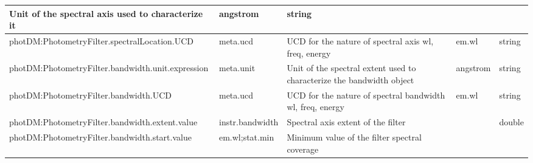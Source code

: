 \documentclass[11pt,a4paper]{ivoa}
\begin{document}
\begin{appendices}
\begin{table}[H]
\begin{adjustbox}{angle=90}
\begin{tabular}{p{5in}p{0.87in}p{2in}p{0.4in}p{0.25in}}
\multicolumn{1}{p{2in}}{{\fontsize{8pt}{8pt}\selectfont Unit of the spectral axis used to characterize it}} &
\multicolumn{1}{p{0.74in}}{{\fontsize{8pt}{8pt}\selectfont angstrom}} &
\multicolumn{1}{p{0.35in}}{{\fontsize{8pt}{8pt}\selectfont string}} \\
\hline
\multicolumn{1}{p{5in}}{{\fontsize{8pt}{8pt}\selectfont photDM:PhotometryFilter.spectralLocation.UCD}} &
\multicolumn{1}{p{0.87in}}{{\fontsize{8pt}{8pt}\selectfont meta.ucd }} &
\multicolumn{1}{p{2in}}{{\fontsize{8pt}{8pt}\selectfont UCD for the nature of spectral axis wl, freq, energy}} &
\multicolumn{1}{p{0.74in}}{{\fontsize{8pt}{8pt}\selectfont em.wl}} &
\multicolumn{1}{p{0.35in}}{{\fontsize{8pt}{8pt}\selectfont string}} \\
\hline
\multicolumn{1}{p{5in}}{{\fontsize{8pt}{8pt}\selectfont photDM:PhotometryFilter.bandwidth.unit.expression}} &
\multicolumn{1}{p{0.87in}}{{\fontsize{8pt}{8pt}\selectfont meta.unit}} &
\multicolumn{1}{p{2in}}{{\fontsize{8pt}{8pt}\selectfont Unit of the spectral extent used to characterize the bandwidth object}} &
\multicolumn{1}{p{0.74in}}{{\fontsize{10pt}{12.0pt}\selectfont angstrom}} &
\multicolumn{1}{p{0.35in}}{{\fontsize{8pt}{8pt}\selectfont string}} \\
\hline
\multicolumn{1}{p{5in}}{
{\fontsize{8pt}{8pt}\selectfont photDM:PhotometryFilter.bandwidth.UCD}} &
\multicolumn{1}{p{0.87in}}{{\fontsize{8pt}{8pt}\selectfont meta.ucd }} &
\multicolumn{1}{p{2in}}{{\fontsize{8pt}{8pt}\selectfont UCD for the nature of spectral bandwidth wl, freq, energy}} &
\multicolumn{1}{p{0.74in}}{{\fontsize{8pt}{8pt}\selectfont em.wl}} &
\multicolumn{1}{p{0.35in}}{{\fontsize{8pt}{8pt}\selectfont string}} \\
\hline
\multicolumn{1}{p{5in}}{{\fontsize{8pt}{8pt}\selectfont photDM:PhotometryFilter.bandwidth.extent.value}} &
\multicolumn{1}{p{0.87in}}{{\fontsize{8pt}{8pt}\selectfont instr.bandwidth}} &
\multicolumn{1}{p{2in}}{{\fontsize{8pt}{8pt}\selectfont Spectral axis extent of the filter}} &
\multicolumn{1}{p{0.74in}}{} &
\multicolumn{1}{p{0.35in}}{{\fontsize{8pt}{8pt}\selectfont double}} \\
\hline
\multicolumn{1}{p{5in}}{{\fontsize{8pt}{8pt}\selectfont photDM:PhotometryFilter.bandwidth.start.value}} &
\multicolumn{1}{p{0.87in}}{{\fontsize{8pt}{8pt}\selectfont em.wl;stat.min}} &
\multicolumn{1}{p{2in}}{{\fontsize{8pt}{8pt}\selectfont Minimum value of the filter spectral coverage}} &

\end{tabular}
\end{adjustbox}
\end{table}
\end{appendices}
\end{document}
